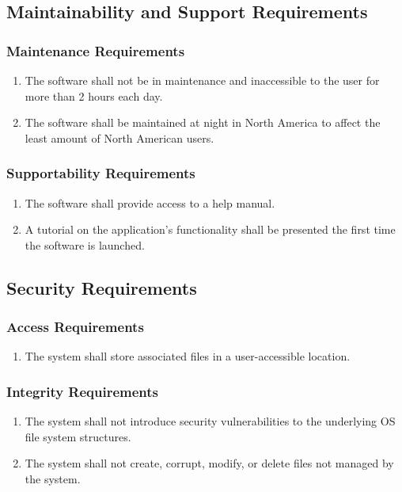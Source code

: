 \documentclass{article}
\begin{document}
\subsection{Maintainability and Support Requirements}
\subsubsection{Maintenance Requirements}
\begin{enumerate}[MR1]
    \item The software shall not be in maintenance and inaccessible to the user for more than 2 hours each day.
    \item The software shall be maintained at night in North America to affect the least amount of North American users.
\end{enumerate}

\subsubsection{Supportability Requirements}
\begin{enumerate}[SUR1]
    \item The software shall provide access to a help manual.
    \item A tutorial on the application's functionality shall be presented the first time the software is launched.
\end{enumerate}

\subsection{Security Requirements}
\subsubsection{Access Requirements}
\begin{enumerate}[{A}CR1]
    \item The system shall store associated files in a user-accessible location.
\end{enumerate}

\subsubsection{Integrity Requirements}
\begin{enumerate}[{I}NT1]
    \item The system shall not introduce security vulnerabilities to the underlying OS file system structures.
    \item The system shall not create, corrupt, modify, or delete files not managed by the system.
\end{enumerate}
\end{document}
